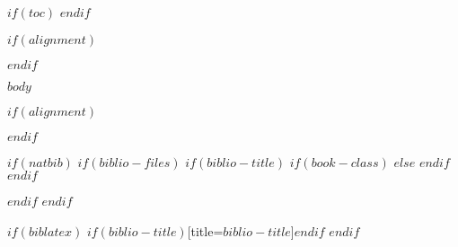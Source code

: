 \documentclass[10pt]{article}
\begin{document}
$if(toc)$
\tableofcontents\newpage
$endif$


$if(alignment)$
\begin{$alignment$}
$endif$

$body$



$if(alignment)$
\end{$alignment$}
$endif$

$if(natbib)$
  $if(biblio-files)$
    $if(biblio-title)$
      $if(book-class)$
        \renewcommand\bibname{$biblio-title$}
      $else$
        \renewcommand\refname{$biblio-title$}
      $endif$
    $endif$
    
    

  $endif$
$endif$

$if(biblatex)$
  \printbibliography$if(biblio-title)$[title=$biblio-title$]$endif$
$endif$
\end{document}
